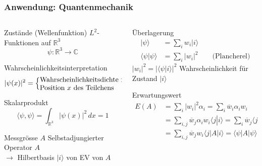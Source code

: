 %
%
%
\bgroup
\begin{frame}[t]
\setlength{\abovedisplayskip}{5pt}
\setlength{\belowdisplayskip}{5pt}
\frametitle{Anwendung: Quantenmechanik}
\vspace{-20pt}
\begin{columns}[t,onlytextwidth]
\begin{column}{0.48\textwidth}
\begin{block}{Zustände (Wellenfunktion)}
$L^2$-Funktionen auf $\mathbb{R}^3$
\[
\psi\colon\mathbb{R}^3\to\mathbb{C}
\]
\end{block}
\vspace{-6pt}
\begin{block}{Wahrscheinlichkeitsinterpretation}
\[
|\psi(x)|^2 = \left\{
\begin{minipage}{4.6cm}\raggedright
Wahrscheinlichkeitsdichte für Position $x$ des Teilchens
\end{minipage}\right.
\]
\end{block}
\vspace{-6pt}
\begin{block}{Skalarprodukt}
\[
\langle\psi,\psi\rangle
=
\int_{\mathbb{R}^3} |\psi(x)|^2\,dx = 1
\]
\end{block}
\vspace{-6pt}
\begin{block}{Messgrösse $A$}
Selbstadjungierter Operator $A$
\\
$\rightarrow$
Hilbertbasis $|i\rangle$ von EV von $A$
\end{block}
\end{column}
\begin{column}{0.48\textwidth}
\begin{block}{Überlagerung}
\begin{align*}
|\psi\rangle
&=
\sum_i
w_i|i\rangle
\\
\langle \psi|\psi\rangle
&=
\sum_i |w_i|^2 \qquad\text{(Plancherel)}
\end{align*}
$|w_i|^2=|\langle \psi|i\rangle|^2$ Wahrscheinlichkeit für Zustand $|i\rangle$
\end{block}
\begin{block}{Erwartungswert}
\begin{align*}
E(A)
&=
\sum_i |w_i|^2 \alpha_i
=
\sum_i \overline{w}_i\alpha_i w_i 
\\
&=
\sum_{i,j} \overline{w}_j\alpha_i w_i \langle j|i\rangle
=
\sum_{i} \overline{w}_j\langle j| \sum_i \alpha_i w_i |i\rangle
\\
&=
\sum_{i,j} \overline{w}_j w_i \langle j|
A|i\rangle
=
\langle \psi| A |\psi\rangle
\end{align*}
\end{block}
\end{column}
\end{columns}
\end{frame}
\egroup
